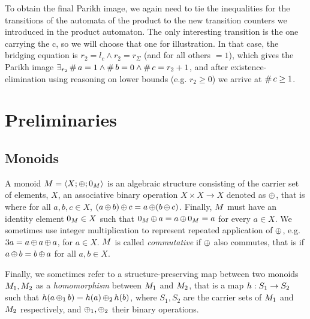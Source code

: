 \documentclass[acmsmall,review,anonymous,screen]{acmart}\settopmatter{printfolios=true,printccs=false,printacmref=true}
\theoremstyle{definition}
\begin{document}

To obtain the final Parikh image, we again need to tie the inequalities for the
transitions of the automata of the product to the new transition counters we
introduced in the product automaton. The only interesting transition is the one
carrying the c, so we will choose that one for illustration. In that case, the
bridging equation is $r_2 = l_c \land r_2 = r_{\Sigma}$ (and for all others
$=1$), which gives the Parikh image $\exists_{r_2} \operatorname{\#}{a} = 1 \land
\operatorname{\#}{b} = 0 \land \operatorname{\#}{c} = r_2 + 1$, and after
existence-elimination using reasoning on lower bounds (e.g. $r_2 \geq 0$) we
arrive at $\operatorname{\#}{c} \geq 1$.

\section{Preliminaries}

\subsection{Monoids}

A monoid $M = \left\langle X;\operatorname{\oplus};0_{M}\right\rangle$ is an algebraic structure
consisting of the carrier set of elements, $X$, an associative binary operation
$X \times X \rightarrow X$ denoted as $\operatorname{\oplus}$, that is where for all $a, b,
c \in X$, $(a \operatorname{\oplus} b) \operatorname{\oplus} c = a \operatorname{\oplus} (b \operatorname{\oplus} c)$. Finally,
$M$ must have an identity element $0_{M} \in X$ such that
$0_{M} \operatorname{\oplus} a = a \operatorname{\oplus} 0_{M} =   a$ for every $a \in X$.
We sometimes use integer multiplication to represent repeated application of
$\operatorname{\oplus}$, e.g. $3a = a \operatorname{\oplus} a \operatorname{\oplus} a$, for $a \in X$. $M$ is
called \textit{commutative} if $\operatorname{\oplus}$ also commutes, that is if $a
\operatorname{\oplus} b = b \operatorname{\oplus} a$ for all $a, b \in X$. 

Finally, we sometimes refer to a structure-preserving map between two monoids
$M_1, M_2$ as a \textit{homomorphism} between $M_1$ and
$M_2$, that is a map $h : S_1 \rightarrow S_2$ such that $h(a
\operatorname{\oplus}_1 b) = h(a) \operatorname{\oplus}_2 h(b)$, where $S_1, S_2$ are the carrier
sets of $M_1$ and $M_2$ respectively, and $\operatorname{\oplus}_1, \operatorname{\oplus}_2$
their binary operations.
\end{document}
